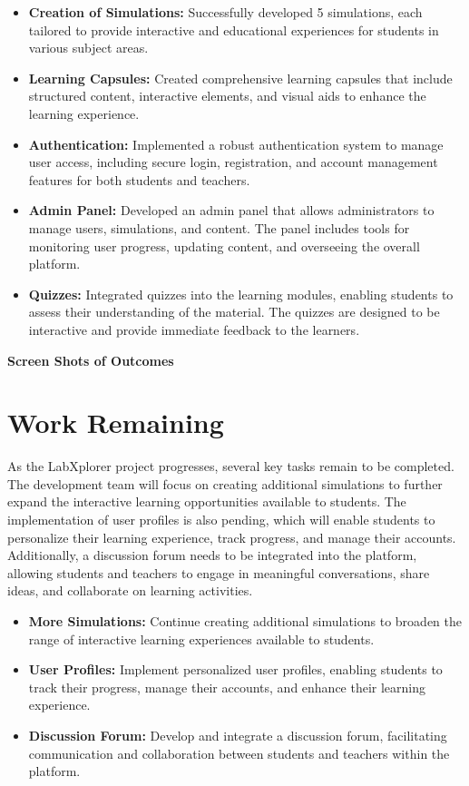 \begin{itemize}[leftmargin=1cm]
    \item \textbf{Creation of Simulations:} Successfully developed 5 simulations, each tailored to provide interactive and educational experiences for students in various subject areas.
    
    \item \textbf{Learning Capsules:} Created comprehensive learning capsules that include structured content, interactive elements, and visual aids to enhance the learning experience.
    
    \item \textbf{Authentication:} Implemented a robust authentication system to manage user access, including secure login, registration, and account management features for both students and teachers.
    
    \item \textbf{Admin Panel:} Developed an admin panel that allows administrators to manage users, simulations, and content. The panel includes tools for monitoring user progress, updating content, and overseeing the overall platform.
    
    \item \textbf{Quizzes:} Integrated quizzes into the learning modules, enabling students to assess their understanding of the material. The quizzes are designed to be interactive and provide immediate feedback to the learners.
\end{itemize}
\textbf{Screen Shots of Outcomes}

\section{Work Remaining}
As the LabXplorer project progresses, several key tasks remain to be completed. The development team will focus on creating additional simulations to further expand the interactive learning opportunities available to students. The implementation of user profiles is also pending, which will enable students to personalize their learning experience, track progress, and manage their accounts. Additionally, a discussion forum needs to be integrated into the platform, allowing students and teachers to engage in meaningful conversations, share ideas, and collaborate on learning activities.

\begin{itemize}[leftmargin=1cm]
    \item \textbf{More Simulations:} Continue creating additional simulations to broaden the range of interactive learning experiences available to students.
    
    \item \textbf{User Profiles:} Implement personalized user profiles, enabling students to track their progress, manage their accounts, and enhance their learning experience.
    
    \item \textbf{Discussion Forum:} Develop and integrate a discussion forum, facilitating communication and collaboration between students and teachers within the platform.
\end{itemize}
